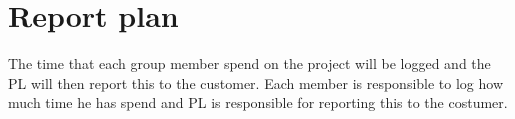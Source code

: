 \section{Report plan}
The time that each group member spend on the project will be logged and the PL will then report this to the customer. Each member is responsible to log how much time he has spend and PL is responsible for reporting this to the costumer.